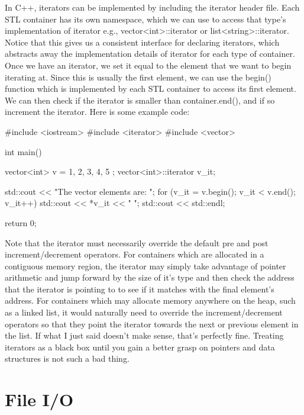 \documentclass{article}
\begin{document}
In C++, iterators can be implemented by including the iterator header file. Each STL container has its own
namespace, which we can use to access that type’s implementation of iterator e.g., vector<int>::iterator or
list<string>::iterator. Notice that this gives us a consistent interface for declaring iterators, which
abstracts away the implementation details of iterator for each type of container. Once we have an iterator,
we set it equal to the element that we want to begin iterating at. Since this is usually the first element,
we can use the begin() function which is implemented by each STL container to access its first element. We
can then check if the iterator is smaller than container.end(), and if so increment the iterator. Here is
some example code:

\begin{cpplst}

#include <iostream>
#include <iterator>
#include <vector>

int main()
{
    vector<int> v = { 1, 2, 3, 4, 5 };
    vector<int>::iterator v_it;

    std::cout << "The vector elements are: ";
    for (v_it = v.begin(); v_it < v.end(); v_it++)
    {
        std::cout << *v_it << " ";
    }
    std::cout << std::endl;

    return 0;
}

\end{cpplst}

Note that the iterator must necessarily override the default pre and post increment/decrement operators. For
containers which are allocated in a contiguous memory region, the iterator may simply take advantage of
pointer arithmetic and jump forward by the size of it’s type and then check the address that the iterator is
pointing to to see if it matches with the final element’s address. For containers which may allocate memory
anywhere on the heap, such as a linked list, it would naturally need to override the increment/decrement
operators so that they point the iterator towards the next or previous element in the list. If what I just
said doesn’t make sense, that’s perfectly fine. Treating iterators as a black box until you gain a better
grasp on pointers and data structures is not such a bad thing.

\section{File I/O}
\end{document}
